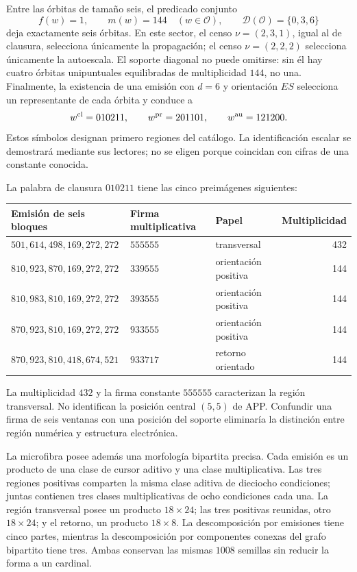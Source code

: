 Entre las órbitas de tamaño seis, el predicado conjunto
\[
 f(w)=1,\qquad m(w)=144\quad(w\in\mathcal O),\qquad
 \mathcal D(\mathcal O)=\{0,3,6\}
\]
deja exactamente seis órbitas. En este sector, el censo \(\nu=(2,3,1)\), igual al de clausura, selecciona únicamente la propagación; el censo \(\nu=(2,2,2)\) selecciona únicamente la autoescala. El soporte diagonal no puede omitirse: sin él hay cuatro órbitas unipuntuales equilibradas de multiplicidad \(144\), no una. Finalmente, la existencia de una emisión con \(d=6\) y orientación \(ES\) selecciona un representante de cada órbita y conduce a
\begin{equation}
 w^{\rm cl}=010211,\qquad w^{\rm pr}=201101,\qquad w^{\rm au}=121200.
 \label{eq:palabras-regionales}
\end{equation}
Estos símbolos designan primero regiones del catálogo. La identificación escalar se demostrará mediante sus lectores; no se eligen porque coincidan con cifras de una constante conocida.

La palabra de clausura \(010211\) tiene las cinco preimágenes siguientes:
\begin{center}\small
\begin{tabular}{@{}lll r@{}}\toprule
Emisión de seis bloques&Firma multiplicativa&Papel&Multiplicidad\\\midrule
\(501,614,498,169,272,272\)&\(555555\)&transversal&432\\
\(810,923,870,169,272,272\)&\(339555\)&orientación positiva&144\\
\(810,983,810,169,272,272\)&\(393555\)&orientación positiva&144\\
\(870,923,810,169,272,272\)&\(933555\)&orientación positiva&144\\
\(870,923,810,418,674,521\)&\(933717\)&retorno orientado&144\\\bottomrule
\end{tabular}
\end{center}
La multiplicidad \(432\) y la firma constante \(555555\) caracterizan la región transversal. No identifican la posición central \((5,5)\) de APP. Confundir una firma de seis ventanas con una posición del soporte eliminaría la distinción entre región numérica y estructura electrónica.

La microfibra posee además una morfología bipartita precisa. Cada emisión es un producto de una clase de cursor aditivo y una clase multiplicativa. Las tres regiones positivas comparten la misma clase aditiva de dieciocho condiciones; juntas contienen tres clases multiplicativas de ocho condiciones cada una. La región transversal posee un producto \(18\times24\); las tres positivas reunidas, otro \(18\times24\); y el retorno, un producto \(18\times8\). La descomposición por emisiones tiene cinco partes, mientras la descomposición por componentes conexas del grafo bipartito tiene tres. Ambas conservan las mismas \(1008\) semillas sin reducir la forma a un cardinal.

